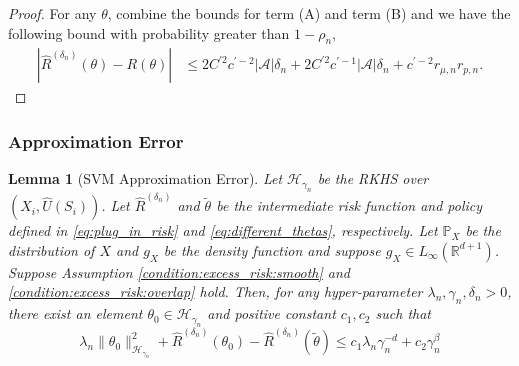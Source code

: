 \documentclass[12pt]{article}
\newtheorem{lemma}{Lemma}%
\newcommand{\R}{\mathbb{R}}
\newcommand{\pr}{\mathbb{P}}
\newcommand{\CP}[1]{{\color{purple}From Chan: #1}}
\newcommand{\XL}[1]{{\color{blue}from Xindi: #1}}
\begin{document}
\begin{proof}
\noindent
For any $\theta$, combine the bounds for term (A) and term (B) and we have the following bound with probability greater than $1-\rho_n$,
\begin{align*}
    \left| \widehat R^{({\delta_n})}(\theta) - R(\theta) \right|&\leq 2C^{\prime2}c^{\prime-2}|\mathcal{A}|\delta_n +2C^{\prime2}c^{\prime-1}|\mathcal{A}|\delta_n + c^{\prime-2}r_{\mu,n}r_{p,n}.
\end{align*}

\end{proof}

\subsubsection{Approximation Error}

\begin{lemma}[SVM Approximation Error]\label{lemma:svm_approximation_error} 
    Let $\mathcal{H}_{\gamma_n}$ be the RKHS over $(X_i,\widehat U(S_i))$. Let $\widehat R^{({\delta_n})}$ and $\tilde \theta$ be the intermediate risk function and policy defined in \eqref{eq:plug_in_risk} and \eqref{eq:different_thetas}, respectively. Let $\pr_X$ be the distribution of $X$ and  $g_X$ be the density function and suppose $g_X\in L_\infty(\R^{d+1})$. Suppose Assumption \ref{condition:excess_risk:smooth} and \ref{condition:excess_risk:overlap} hold. Then, for any  hyper-parameter $\lambda_n, \gamma_n,\delta_n>0$, there exist an element $\theta_0\in \mathcal{H}_{\gamma_n}$ and positive constant $c_1,c_2$ such that  
\begin{equation}\label{eq:approx_error_svm}
\lambda_n\|\theta_0\|^2_{\mathcal{H}_{\gamma_n}}+\widehat R^{({\delta_n})}(\theta_0) -\widehat R^{({\delta_n})}(\tilde\theta) \leq c_1 \lambda_n\gamma_n^{-d} + c_2\gamma_n^{\beta}
    \end{equation}

\end{lemma}
\end{document}
